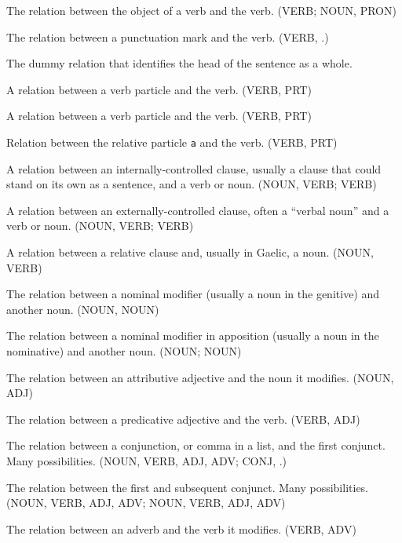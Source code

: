 \documentclass[a4paper]{article}
\begin{document}
 The relation between the object of a verb and the verb. (VERB; NOUN, PRON)

 The relation between a punctuation mark and the verb. (VERB, .)

 The dummy relation that identifies the head of the sentence as a whole.

 A relation between a verb particle and the verb. (VERB, PRT)

 A relation between a verb particle and the verb. (VERB, PRT)

 Relation between the relative particle \texttt{a} and the verb. (VERB, PRT)

 A relation between an internally-controlled clause, usually a clause that could stand on its own as a sentence, and a verb or noun. (NOUN, VERB; VERB)

 A relation between an externally-controlled clause, often a ``verbal noun'' and a verb or noun. (NOUN, VERB; VERB)

 A relation between a relative clause and, usually in Gaelic, a noun. (NOUN, VERB)

 The relation between a nominal modifier (usually a noun in the genitive) and another noun. (NOUN, NOUN)

 The relation between a nominal modifier in apposition (usually a noun in the nominative) and another noun. (NOUN; NOUN)

 The relation between an attributive adjective and the noun it modifies. (NOUN, ADJ)

 The relation between a predicative adjective and the verb. (VERB, ADJ)

 The relation between a conjunction, or comma in a list, and the first conjunct. Many possibilities. (NOUN, VERB, ADJ, ADV; CONJ, .)

 The relation between the first and subsequent conjunct. Many possibilities. (NOUN, VERB, ADJ, ADV;  NOUN, VERB, ADJ, ADV)

 The relation between an adverb and the verb it modifies. (VERB, ADV)
\end{document}
